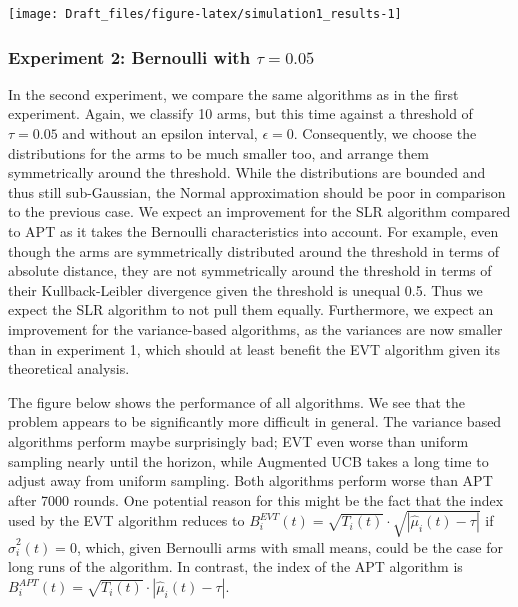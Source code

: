 \documentclass[12pt,]{article}
\begin{document}
\begin{center}\texttt{[image: Draft\_files/figure-latex/simulation1\_results-1]} \end{center}

\subsubsection{\texorpdfstring{Experiment 2: Bernoulli with
\(\tau = 0.05\)}{Experiment 2: Bernoulli with \textbackslash{}tau = 0.05}}\label{experiment-2-bernoulli-with-tau-0.05}

In the second experiment, we compare the same algorithms as in the first
experiment. Again, we classify 10 arms, but this time against a
threshold of \(\tau = 0.05\) and without an epsilon interval,
\(\epsilon = 0\). Consequently, we choose the distributions for the arms
to be much smaller too, and arrange them symmetrically around the
threshold. While the distributions are bounded and thus still
sub-Gaussian, the Normal approximation should be poor in comparison to
the previous case. We expect an improvement for the SLR algorithm
compared to APT as it takes the Bernoulli characteristics into account.
For example, even though the arms are symmetrically distributed around
the threshold in terms of absolute distance, they are not symmetrically
around the threshold in terms of their Kullback-Leibler divergence given
the threshold is unequal 0.5. Thus we expect the SLR algorithm to not
pull them equally. Furthermore, we expect an improvement for the
variance-based algorithms, as the variances are now smaller than in
experiment 1, which should at least benefit the EVT algorithm given its
theoretical analysis.

The figure below shows the performance of all algorithms. We see that
the problem appears to be significantly more difficult in general. The
variance based algorithms perform maybe surprisingly bad; EVT even worse
than uniform sampling nearly until the horizon, while Augmented UCB
takes a long time to adjust away from uniform sampling. Both algorithms
perform worse than APT after 7000 rounds. One potential reason for this
might be the fact that the index used by the EVT algorithm reduces to
\(B_i^{EVT}(t) = \sqrt{T_i(t)} \cdot \sqrt{|\hat{\mu}_i(t) - \tau|}\) if
\(\hat{\sigma}_i^2(t) = 0\), which, given Bernoulli arms with small
means, could be the case for long runs of the algorithm. In contrast,
the index of the APT algorithm is
\(B_i^{APT}(t) = \sqrt{T_i(t)} \cdot |\hat{\mu}_i(t) - \tau|\).
\end{document}
